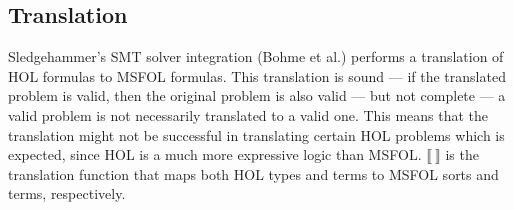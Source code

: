 \documentclass{article}
\begin{document}
	\subsection{Translation}
	\label{sec:trans}
	Sledgehammer's SMT solver 
	integration (Bohme et al.) performs 
	a translation 
	of HOL formulas to MSFOL formulas.
	This translation is sound ---
	if the translated problem is 
	valid, then the original problem 
	is also valid --- but not complete
	--- a valid problem is not 
	necessarily translated to a 
	valid one. This means that the 
	translation might not be 
	successful in translating 
	certain HOL problems which is
	expected, since HOL is a 
	much more expressive logic than 
	MSFOL. $\llbracket\ \rrbracket$
	is the translation function 
	that maps both HOL types and 
	terms to MSFOL sorts and terms,
	respectively.
	
\end{document}
